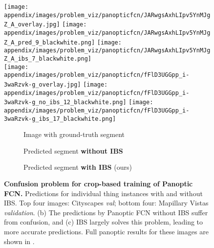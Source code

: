 \documentclass[10pt,twocolumn,letterpaper]{article}
\begin{document}
\begin{figure*}[t]
\texttt{[image: appendix/images/problem\_viz/panopticfcn/JARwgsAxhLIpv5YnMJgZ\_A\_overlay.jpg]}
\texttt{[image: appendix/images/problem\_viz/panopticfcn/JARwgsAxhLIpv5YnMJgZ\_A\_pred\_9\_blackwhite.png]}
\texttt{[image: appendix/images/problem\_viz/panopticfcn/JARwgsAxhLIpv5YnMJgZ\_A\_ibs\_7\_blackwhite.png]}\\



\texttt{[image: appendix/images/problem\_viz/panopticfcn/fFlD3UGGpp\_i-3waRzvk-g\_overlay.jpg]}
\texttt{[image: appendix/images/problem\_viz/panopticfcn/fFlD3UGGpp\_i-3waRzvk-g\_no\_ibs\_12\_blackwhite.png]}
\texttt{[image: appendix/images/problem\_viz/panopticfcn/fFlD3UGGpp\_i-3waRzvk-g\_ibs\_17\_blackwhite.png]}\\


 \begin{subfigure}[b]{0.28\textwidth}
     \centering
     \caption{Image with ground-truth segment}
 \end{subfigure}
 \begin{subfigure}[b]{0.28\textwidth}
     \centering
     \caption{Predicted segment \textbf{without IBS}}
 \end{subfigure}
  \begin{subfigure}[b]{0.28\textwidth}
     \centering
     \caption{Predicted segment \textbf{with IBS} (ours)}
 \end{subfigure}

\vspace{-10pt}
\caption{\textbf{Confusion problem for crop-based training of Panoptic FCN.} Predictions for individual thing instances with and without IBS. Top four images: Cityscapes \textit{val}; bottom four: Mapillary Vistas \textit{validation}. (b) The predictions by Panoptic FCN without IBS suffer from confusion, and (c) IBS largely solves this problem, leading to more accurate predictions. Full panoptic results for these images are shown in .} 
\label{fig:results_panfcn_problem}
\end{figure*} 
\end{document}
